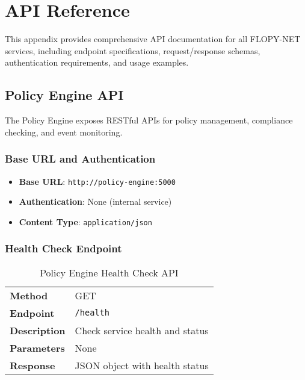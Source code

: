 \section{API Reference}
\label{appendix:api-reference}

This appendix provides comprehensive API documentation for all FLOPY-NET services, including endpoint specifications, request/response schemas, authentication requirements, and usage examples.

\subsection{Policy Engine API}

The Policy Engine exposes RESTful APIs for policy management, compliance checking, and event monitoring.

\subsubsection{Base URL and Authentication}

\begin{itemize}
    \item \textbf{Base URL}: \texttt{http://policy-engine:5000}
    \item \textbf{Authentication}: None (internal service)
    \item \textbf{Content Type}: \texttt{application/json}
\end{itemize}

\subsubsection{Health Check Endpoint}

\begin{table}[H]
\centering
\caption{Policy Engine Health Check API}
\label{tab:policy-health-api}
\begin{tabularx}{\textwidth}{@{}lX@{}}
\toprule
\textbf{Method} & GET \\
\textbf{Endpoint} & \texttt{/health} \\
\textbf{Description} & Check service health and status \\
\textbf{Parameters} & None \\
\textbf{Response} & JSON object with health status \\
\bottomrule
\end{tabularx}
\end{table}

